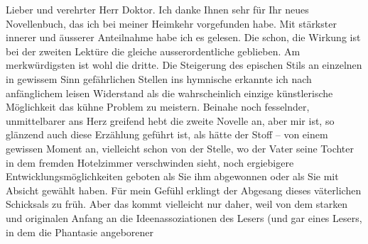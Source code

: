 \pstart{}Lieber und verehrter Herr Doktor.\pend\vspace{0.5em}
\pstart
           Ich danke Ihnen sehr für Ihr neues Novellenbuch, das ich bei meiner Heimkehr vorgefunden habe. Mit stärkster
               innerer und äusserer Anteilnahme habe ich es gelesen. Die \label{K_L03747-1v}\label{K_L03747-1} schon, die Wirkung ist bei der
               zweiten Lektüre die gleiche ausserordentliche geblieben. Am merkwürdigsten ist wohl
               die dritte. Die Steigerung
               des epischen Stils an einzelnen in gewissem Sinn gefährlichen Stellen \introOben{}ins
                  hymnische\introOben{} erkannte ich nach anfänglichem leisen Widerstand als die
               wahrscheinlich einzige künstlerische Möglichkeit das kühne Problem zu meistern.
               Beinahe noch fesselnder, unmittelbarer ans Herz greifend hebt die zweite Novelle an, aber mir ist, so
               glänzend auch diese Erzählung geführt ist, als hätte der Stoff – von einem gewissen
               Moment an, vielleicht schon von der Stelle, wo der Vater seine Tochter in dem fremden
               Hotelzimmer verschwinden sieht, noch ergiebigere Entwicklungsmöglichkeiten geboten
               als Sie ihm abgewonnen oder als Sie mit Absicht gewählt haben. Für mein Gefühl
               erklingt der Abgesang dieses väterlichen Schicksals zu früh. Aber das kommt
               vielleicht nur daher, weil von dem starken und originalen Anfang an die
               Ideenassoziationen des Lesers (und gar eines Lesers, in dem die Phantasie angeborener

